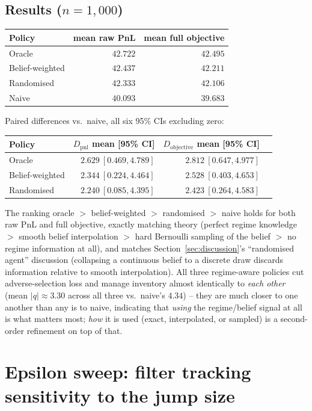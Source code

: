 \documentclass[11pt]{article}
\begin{document}
\subsection{Results ($n=1{,}000$)}
\begin{center}
\begin{tabular}{@{}lrr@{}}
\toprule
Policy & mean raw PnL & mean full objective \\
\midrule
Oracle & $42.722$ & $42.495$ \\
Belief-weighted & $42.437$ & $42.211$ \\
Randomised & $42.333$ & $42.106$ \\
Naive & $40.093$ & $39.683$ \\
\bottomrule
\end{tabular}
\end{center}
Paired differences vs.\ naive, all six 95\% CIs excluding zero:
\begin{center}
\begin{tabular}{@{}lrrr@{}}
\toprule
Policy & $D_{\text{pnl}}$ mean [95\% CI] & $D_{\text{objective}}$ mean [95\% CI] \\
\midrule
Oracle & $2.629\ [0.469, 4.789]$ & $2.812\ [0.647, 4.977]$ \\
Belief-weighted & $2.344\ [0.224, 4.464]$ & $2.528\ [0.403, 4.653]$ \\
Randomised & $2.240\ [0.085, 4.395]$ & $2.423\ [0.264, 4.583]$ \\
\bottomrule
\end{tabular}
\end{center}
The ranking oracle $>$ belief-weighted $>$ randomised $>$ naive holds for both raw PnL and full objective, exactly matching theory (perfect regime knowledge $>$ smooth belief interpolation $>$ hard Bernoulli sampling of the belief $>$ no regime information at all), and matches Section~\ref{sec:discussion}'s ``randomised agent'' discussion (collapsing a continuous belief to a discrete draw discards information relative to smooth interpolation). All three regime-aware policies cut adverse-selection loss and manage inventory almost identically to \emph{each other} (mean $|q|\approx 3.30$ across all three vs.\ naive's $4.34$) -- they are much closer to one another than any is to naive, indicating that \emph{using} the regime/belief signal at all is what matters most; \emph{how} it is used (exact, interpolated, or sampled) is a second-order refinement on top of that.

\section{Epsilon sweep: filter tracking sensitivity to the jump size}
\label{sec:epsilonsweep}
\end{document}
